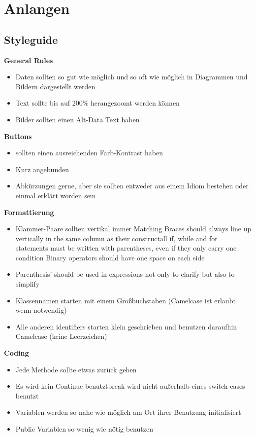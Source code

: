 \documentclass[11pt]{article}
\begin{document}
\section{Anlangen}
\label{chap: Anlagen}
\subsection{Styleguide}


\textbf{General Rules}
\begin{itemize}
\item Daten sollten so gut wie möglich und so oft wie möglich in Diagrammen und Bildern dargestellt werden
\item Text sollte bis auf 200\% herangezoomt werden können \item Bilder sollten einen Alt-Data Text haben\\
\end{itemize}

\textbf{Buttons}
\begin{itemize}
\item sollten einen ausreichenden Farb-Kontrast haben
\item Kurz angebunden
\item Abkürzungen gerne, aber sie sollten entweder aus einem Idiom bestehen oder einmal erklärt worden sein\\
\end{itemize}

\textbf{Formattierung}
\begin{itemize}
\item Klammer-Paare sollten vertikal immer Matching Braces should always line up vertically in the same column as their constructall if, while and for statements must be written with parentheses, even if they only carry one condition
Binary operators should have one space on each side
\item Parenthesis' should be used in expressions not only to clarify but also to simplify
\item Klassennamen starten mit einem Großbuchstaben (Camelcase ist erlaubt wenn notwendig)
\item Alle anderen identifiers starten klein geschrieben und benutzen daraufhin Camelcase (keine Leerzeichen)\\
\end{itemize}

\textbf{Coding}
\begin{itemize}
\item Jede Methode sollte etwas zurück geben
\item Es wird kein Continue benutztbreak wird nicht außerhalb eines switch-cases benutzt
\item Variablen werden so nahe wie möglich am Ort ihrer Benutzung initialisiert
\item Public Variablen so wenig wie nötig benutzen\\
\end{itemize}
\end{document}
